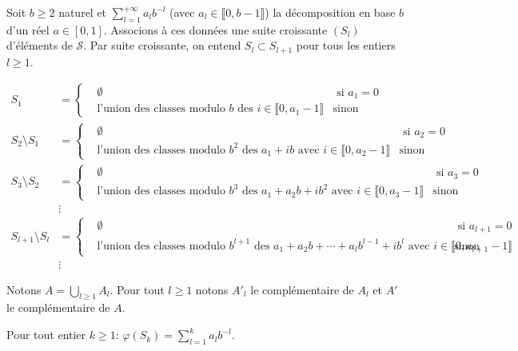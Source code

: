 Soit $b \geq 2$ naturel et $\sum_{l=1}^{+\infty}a_l b^{-l}$ (avec $a_l \in \llbracket 0, b-1 \rrbracket$) la décomposition en base $b$ d'un réel $a\in [0,1]$. Associons à ces données une suite croissante $(S_l)$ d'éléments de $\mathcal{S}$. Par suite croissante, on entend $S_l \subset S_{l+1}$ pour tous les entiers $l\geq1$.

\begin{align*}
 S_1 &= \left\lbrace
   \begin{aligned}
   & \emptyset &\text{ si } a_1 = 0 \\
   &\text{l'union des classes modulo } b \text{ des } i \in \llbracket 0, a_1-1\rrbracket &\text{sinon}
   \end{aligned}
   \right. \\
 S_2 \setminus S_1 &= \left\lbrace
   \begin{aligned}
   & \emptyset &\text{ si } a_2 = 0 \\
   &\text{l'union des classes modulo } b^2 \text{ des } a_1 + ib \text{ avec }i \in \llbracket 0, a_2-1\rrbracket &\text{sinon}
   \end{aligned}
   \right. \\
 S_3 \setminus S_2 &= \left\lbrace
   \begin{aligned}
   & \emptyset &\text{ si } a_3 = 0 \\
   &\text{l'union des classes modulo } b^3 \text{ des } a_1 + a_2b + ib^2 \text{ avec }i \in \llbracket 0, a_3-1\rrbracket &\text{sinon}
   \end{aligned}
   \right. \\
   & \vdots \\
 S_{l+1} \setminus S_l &= \left\lbrace
   \begin{aligned}
   & \emptyset &\text{ si } a_{l+1} = 0 \\
   &\text{l'union des classes modulo } b^{l+1} \text{ des } a_1 + a_2b + \cdots + a_lb^{l-1} + ib^{l} \text{ avec }i \in \llbracket 0, a_{l+1}-1\rrbracket &\text{sinon}
   \end{aligned}
   \right. \\
   & \vdots
\end{align*}
\begin{defi}
 Notons $A = \bigcup_{l\geq 1}A_l$.\newline
 Pour tout $l\geq 1$ notons $A'_l$ le complémentaire de $A_l$ et $A'$ le complémentaire de $A$.
\end{defi}
\begin{prop}
 Pour tout entier $k\geq 1$:
 \begin{math}
  \varphi(S_k)= \sum_{l=1}^k a_l b^{-l}.
 \end{math}
\end{prop}
